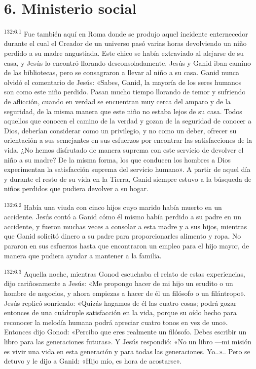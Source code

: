 \section*{6. Ministerio social}
\par
\textsuperscript{132:6.1} Fue también aquí en Roma donde se produjo aquel incidente enternecedor durante el cual el Creador de un universo pasó varias horas devolviendo un niño perdido a su madre angustiada. Este chico se había extraviado al alejarse de su casa, y Jesús lo encontró llorando desconsoladamente. Jesús y Ganid iban camino de las bibliotecas, pero se consagraron a llevar al niño a su casa. Ganid nunca olvidó el comentario de Jesús: «Sabes, Ganid, la mayoría de los seres humanos son como este niño perdido. Pasan mucho tiempo llorando de temor y sufriendo de aflicción, cuando en verdad se encuentran muy cerca del amparo y de la seguridad, de la misma manera que este niño no estaba lejos de su casa. Todos aquellos que conocen el camino de la verdad y gozan de la seguridad de conocer a Dios, deberían considerar como un privilegio, y no como un deber, ofrecer su orientación a sus semejantes en sus esfuerzos por encontrar las satisfacciones de la vida. ¿No hemos disfrutado de manera suprema con este servicio de devolver el niño a su madre? De la misma forma, los que conducen los hombres a Dios experimentan la satisfacción suprema del servicio humano». A partir de aquel día y durante el resto de su vida en la Tierra, Ganid siempre estuvo a la búsqueda de niños perdidos que pudiera devolver a su hogar.

\par
\textsuperscript{132:6.2} Había una viuda con cinco hijos cuyo marido había muerto en un accidente. Jesús contó a Ganid cómo él mismo había perdido a su padre en un accidente, y fueron muchas veces a consolar a esta madre y a sus hijos, mientras que Ganid solicitó dinero a su padre para proporcionarles alimento y ropa. No pararon en sus esfuerzos hasta que encontraron un empleo para el hijo mayor, de manera que pudiera ayudar a mantener a la familia.

\par
\textsuperscript{132:6.3} Aquella noche, mientras Gonod escuchaba el relato de estas experiencias, dijo cariñosamente a Jesús: «Me propongo hacer de mi hijo un erudito o un hombre de negocios, y ahora empiezas a hacer de él un filósofo o un filántropo». Jesús replicó sonriendo: «Quizás hagamos de él las cuatro cosas; podrá gozar entonces de una cuádruple satisfacción en la vida, porque su oído hecho para reconocer la melodía humana podrá apreciar cuatro tonos en vez de uno». Entonces dijo Gonod: «Percibo que eres realmente un filósofo. Debes escribir un libro para las generaciones futuras». Y Jesús respondió: «No un libro ---mi misión es vivir una vida en esta generación y para todas las generaciones. Yo..».. Pero se detuvo y le dijo a Ganid: «Hijo mío, es hora de acostarse».

